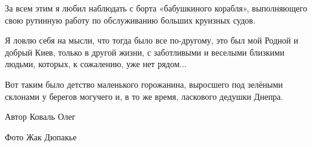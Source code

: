 За всем этим я любил наблюдать с борта «бабушкиного корабля», выполняющего свою
рутинную работу по обслуживанию больших круизных судов.

Я ловлю себя на мысли, что тогда было все по-другому, это был мой Родной и
добрый Киев, только в другой жизни, с заботливыми и веселыми близкими людьми,
которых, к сожалению, уже нет рядом...

Вот таким было детство маленького горожанина, выросшего под зелёными склонами у
берегов могучего и, в то же время, ласкового дедушки Днепра.

Автор Коваль Олег

Фото Жак Дюпакье


